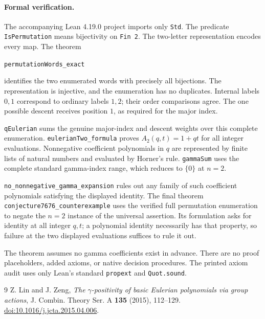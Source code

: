 \documentclass[11pt]{article}
\begin{document}
\newpage
\paragraph{Formal verification.}
The accompanying Lean 4.19.0 project imports only \texttt{Std}.
The predicate \texttt{IsPermutation} means bijectivity on \texttt{Fin 2}.
The two-letter representation encodes every map. The theorem
\begin{center}\texttt{permutationWords\_exact}\end{center}
identifies the two enumerated words with precisely all bijections.
The representation is injective, and the enumeration has no duplicates.
Internal labels $0,1$ correspond to ordinary labels $1,2$; their order
comparisons agree. The one possible descent receives position $1$, as
required for the major index.

\texttt{qEulerian} sums the genuine major-index and descent weights over
this complete enumeration. \texttt{eulerianTwo\_formula} proves
$A_2(q,t)=1+qt$ for all integer evaluations. Nonnegative coefficient
polynomials in $q$ are represented by finite lists of natural numbers
and evaluated by Horner's rule. \texttt{gammaSum} uses the complete
standard gamma-index range, which reduces to $\{0\}$ at $n=2$.

\texttt{no\_nonnegative\_gamma\_expansion} rules out any family of
such coefficient polynomials satisfying the displayed identity.
The final theorem \texttt{conjecture7676\_counterexample} uses the
verified full permutation enumeration to negate the $n=2$ instance of
the universal assertion. Its formulation asks for identity at all
integer $q,t$; a polynomial identity necessarily has that property, so
failure at the two displayed evaluations suffices to rule it out.

The theorem assumes no gamma coefficients exist in advance. There are
no proof placeholders, added axioms, or native decision procedures.
The printed axiom audit uses only Lean's standard \texttt{propext} and
\texttt{Quot.sound}.

\begin{thebibliography}{9}
Z. Lin and J. Zeng,
\emph{The $\gamma$-positivity of basic Eulerian polynomials via group actions},
J. Combin. Theory Ser. A \textbf{135} (2015), 112--129.
\href{https://doi.org/10.1016/j.jcta.2015.04.006}{doi:10.1016/j.jcta.2015.04.006}.
\end{thebibliography}
\end{document}
